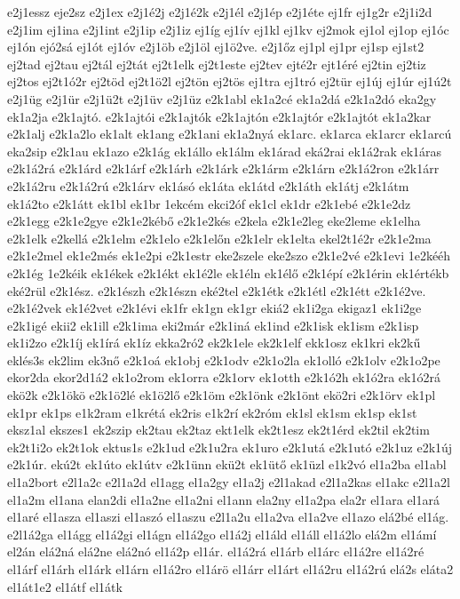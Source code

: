 {e2j1essz
eje2sz
e2j1ex
e2j1é2j
e2j1é2k
e2j1él
e2j1ép
e2j1éte
ej1fr
ej1g2r
e2j1i2d
e2j1im
ej1ina
e2j1int
e2j1ip
e2j1iz
ej1íg
ej1ív
ej1kl
ej1kv
ej2mok
ej1ol
ej1op
ej1óc
ej1ón
ejó2sá
ej1ót
ej1óv
e2j1öb
e2j1öl
ej1ö2ve.
e2j1őz
ej1pl
ej1pr
ej1sp
ej1st2
ej2tad
ej2tau
ej2tál
ej2tát
ej2t1elk
ej2t1este
ej2tev
ejté2r
ejt1éré
ej2tin
ej2tiz
ej2tos
ej2t1ó2r
ej2töd
ej2t1ö2l
ej2tön
ej2tös
ej1tra
ej1tró
ej2tür
ej1új
ej1úr
ej1ú2t
e2j1üg
e2j1ür
e2j1ü2t
e2j1üv
e2j1üz
e2k1abl
ek1a2cé
ek1a2dá
e2k1a2dó
eka2gy
ek1a2ja
e2k1ajtó.
e2k1ajtói
e2k1ajtók
e2k1ajtón
e2k1ajtór
e2k1ajtót
ek1a2kar
e2k1alj
e2k1a2lo
ek1alt
ek1ang
e2k1ani
ek1a2nyá
ek1arc.
ek1arca
ek1arcr
ek1arcú
eka2sip
e2k1au
ek1azo
e2k1ág
ek1állo
ek1álm
ek1árad
eká2rai
ek1á2rak
ek1áras
e2k1á2rá
e2k1árd
e2k1árf
e2k1árh
e2k1árk
e2k1árm
e2k1árn
e2k1á2ron
e2k1árr
e2k1á2ru
e2k1á2rú
e2k1árv
ek1ásó
ek1áta
ek1átd
e2k1áth
ek1átj
e2k1átm
ek1á2to
e2k1átt
ek1bl
ek1br
1ekcém
ekci2óf
ek1cl
ek1dr
e2k1ebé
e2k1e2dz
e2k1egg
e2k1e2gye
e2k1e2kébő
e2k1e2kés
e2kela
e2k1e2leg
eke2leme
ek1elha
e2k1elk
e2kellá
e2k1elm
e2k1elo
e2k1előn
e2k1elr
ek1elta
ekel2t1é2r
e2k1e2ma
e2k1e2mel
ek1e2més
ek1e2pi
e2k1estr
eke2szele
eke2szo
e2k1e2vé
e2k1evi
1e2kééh
e2k1ég
1e2kéik
ek1ékek
e2k1ékt
ek1é2le
ek1éln
ek1élő
e2k1épí
e2k1érin
ek1értékb
eké2rül
e2k1ész.
e2k1észh
e2k1észn
eké2tel
e2k1étk
e2k1étl
e2k1étt
e2k1é2ve.
e2k1é2vek
ek1é2vet
e2k1évi
ek1fr
ek1gn
ek1gr
ekiá2
ek1i2ga
ekigaz1
ek1i2ge
e2k1igé
ekii2
ek1ill
e2k1ima
eki2már
e2k1iná
ek1ind
e2k1isk
ek1ism
e2k1isp
ek1i2zo
e2k1íj
ek1írá
ek1íz
ekka2ró2
ek2k1ele
ek2k1elf
ekk1osz
ek1kri
ek2kű
eklés3s
ek2lim
ek3nő
e2k1oá
ek1obj
e2k1odv
e2k1o2la
ek1olló
e2k1olv
e2k1o2pe
ekor2da
ekor2d1á2
ek1o2rom
ek1orra
e2k1orv
ek1otth
e2k1ó2h
ek1ó2ra
ek1ó2rá
ekö2k
e2k1ökö
e2k1ö2lé
ek1ö2lő
e2k1öm
e2k1önk
e2k1önt
ekö2ri
e2k1örv
ek1pl
ek1pr
ek1ps
e1k2ram
e1krétá
ek2ris
e1k2rí
ek2róm
ek1sl
ek1sm
ek1sp
ek1st
eksz1al
ekszes1
ek2szip
ek2tau
ek2taz
ekt1elk
ek2t1esz
ek2t1érd
ek2til
ek2tim
ek2t1i2o
ek2t1ok
ektus1s
e2k1ud
e2k1u2ra
ek1uro
e2k1utá
e2k1utó
e2k1uz
e2k1új
e2k1úr.
ekú2t
ek1úto
ek1útv
e2k1ünn
ekü2t
ek1ütő
ek1üzl
e1k2vó
el1a2ba
el1abl
el1a2bort
e2l1a2c
e2l1a2d
el1agg
el1a2gy
el1a2j
e2l1akad
e2l1a2kas
el1akc
e2l1a2l
el1a2m
el1ana
elan2di
el1a2ne
el1a2ni
el1ann
ela2ny
el1a2pa
ela2r
el1ara
el1ará
el1aré
el1asza
el1aszi
el1aszó
el1aszu
e2l1a2u
el1a2va
el1a2ve
el1azo
elá2bé
el1ág.
e2l1á2ga
el1ágg
el1á2gi
el1ágn
el1á2go
el1á2j
el1áld
el1áll
el1á2lo
elá2m
el1ámí
el2án
elá2ná
elá2ne
elá2nó
el1á2p
el1ár.
el1á2rá
el1árb
el1árc
el1á2re
el1á2ré
el1árf
el1árh
el1árk
el1árn
el1á2ro
el1árö
el1árr
el1árt
el1á2ru
el1á2rú
elá2s
eláta2
el1át1e2
el1átf
el1átk
}
